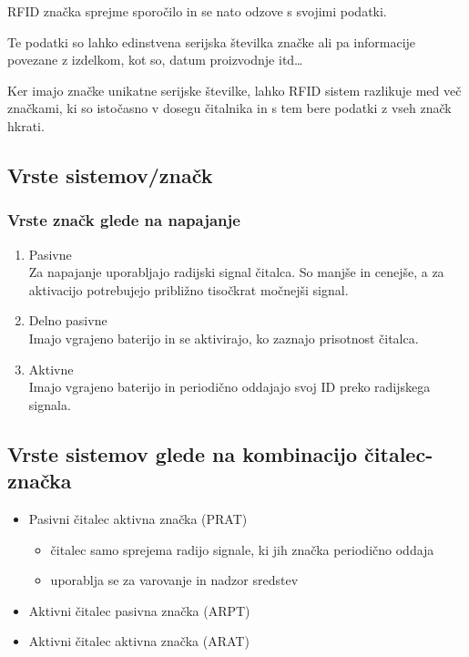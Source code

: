 \documentclass[]{article}
\begin{document}
\noindent
RFID zna\v{c}ka sprejme sporo\v{c}ilo in se nato odzove s svojimi
podatki.

Te podatki so lahko edinstvena serijska \v{s}tevilka zna\v{c}ke ali
pa informacije povezane z izdelkom, kot so, datum proizvodnje itd\ldots

Ker imajo zna\v{c}ke unikatne serijske \v{s}tevilke, lahko RFID sistem
razlikuje med ve\v{c} zna\v{c}kami, ki so isto\v{c}asno v dosegu
\v{c}italnika in s tem bere podatki z vseh zna\v{c}k hkrati.

\subsection{Vrste sistemov/zna\v{c}k}
\subsubsection{Vrste zna\v{c}k glede na napajanje}
\begin{enumerate}
  \item Pasivne \\
    Za napajanje uporabljajo radijski signal \v{c}italca. So
    manj\v{s}e in cenej\v{s}e, a za aktivacijo potrebujejo
    pribli\v{z}no tiso\v{c}krat mo\v{c}nej\v{s}i signal.
  \item Delno pasivne \\
    Imajo vgrajeno baterijo in se aktivirajo, ko zaznajo prisotnost
    \v{c}italca.
  \item Aktivne \\
    Imajo vgrajeno baterijo in periodi\v{c}no oddajajo svoj ID preko
    radijskega signala.
\end{enumerate}

\subsection{Vrste sistemov glede na kombinacijo \v{c}italec-zna\v{c}ka}
\begin{itemize}
  \item Pasivni \v{c}italec aktivna zna\v{c}ka (PRAT)
    \begin{itemize}
      \item \v{c}italec samo sprejema radijo signale, ki jih
        zna\v{c}ka periodi\v{c}no oddaja
      \item uporablja se za varovanje in nadzor sredstev
    \end{itemize}
  \item Aktivni \v{c}italec pasivna zna\v{c}ka (ARPT)
  \item Aktivni \v{c}italec aktivna zna\v{c}ka (ARAT)
\end{itemize}
\end{document}
